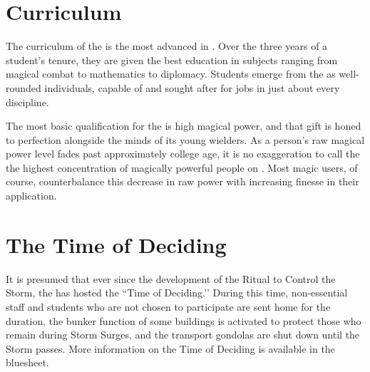 \documentclass[blue]{GL2020}
\begin{document}
\section*{Curriculum}
The curriculum of the \pSc{} is the most advanced in \pEarth{}. Over the three years of a student’s tenure, they are given the best education in subjects ranging from magical combat to mathematics to diplomacy. Students emerge from the \pSchool{} as well-rounded individuals, capable of and sought after for jobs in just about every discipline.

The most basic qualification for the \pSc{} is high magical power, and that gift is honed to perfection alongside the minds of its young wielders. As a person’s raw magical power level fades past approximately college age, it is no exaggeration to call the \pSchool{} the highest concentration of magically powerful people on \pEarth{}. Most magic users, of course, counterbalance this decrease in raw power with increasing finesse in their application.

\section*{The Time of Deciding}
It is presumed that ever since the development of the Ritual to Control the Storm, the \pSchool{} has hosted the ``Time of Deciding.’’ During this time, non-essential staff and students who are not chosen to participate are sent home for the duration, the bunker function of some buildings is activated to protect those who remain during Storm Surges, and the transport gondolas are shut down until the Storm passes. More information on the Time of Deciding is available in the \bWorld{} bluesheet.
\end{document}
